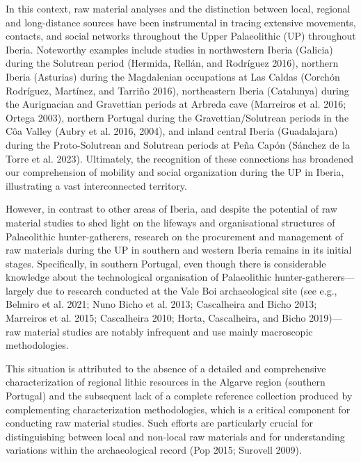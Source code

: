 \documentclass[
  a4paper,
  DIV=11,
  numbers=noendperiod]{scrreprt}
\begin{document}
In this context, raw material analyses and the distinction between
local, regional and long-distance sources have been instrumental in
tracing extensive movements, contacts, and social networks throughout
the Upper Palaeolithic (UP) throughout Iberia. Noteworthy examples
include studies in northwestern Iberia (Galicia) during the Solutrean
period (Hermida, Rellán, and Rodríguez 2016), northern Iberia (Asturias)
during the Magdalenian occupations at Las Caldas (Corchón Rodríguez,
Martínez, and Tarriño 2016), northeastern Iberia (Catalunya) during the
Aurignacian and Gravettian periods at Arbreda cave (Marreiros et al.
2016; Ortega 2003), northern Portugal during the Gravettian/Solutrean
periods in the Côa Valley (Aubry et al. 2016, 2004), and inland central
Iberia (Guadalajara) during the Proto-Solutrean and Solutrean periods at
Peña Capón (Sánchez de la Torre et al. 2023). Ultimately, the
recognition of these connections has broadened our comprehension of
mobility and social organization during the UP in Iberia, illustrating a
vast interconnected territory.

However, in contrast to other areas of Iberia, and despite the potential
of raw material studies to shed light on the lifeways and organisational
structures of Palaeolithic hunter-gatherers, research on the procurement
and management of raw materials during the UP in southern and western
Iberia remains in its initial stages. Specifically, in southern
Portugal, even though there is considerable knowledge about the
technological organisation of Palaeolithic hunter-gatherers---largely
due to research conducted at the Vale Boi archaeological site (see e.g.,
Belmiro et al. 2021; Nuno Bicho et al. 2013; Cascalheira and Bicho 2013;
Marreiros et al. 2015; Cascalheira 2010; Horta, Cascalheira, and Bicho
2019)---raw material studies are notably infrequent and use mainly
macroscopic methodologies.

This situation is attributed to the absence of a detailed and
comprehensive characterization of regional lithic resources in the
Algarve region (southern Portugal) and the subsequent lack of a complete
reference collection produced by complementing characterization
methodologies, which is a critical component for conducting raw material
studies. Such efforts are particularly crucial for distinguishing
between local and non-local raw materials and for understanding
variations within the archaeological record (Pop 2015; Surovell 2009).
\end{document}

